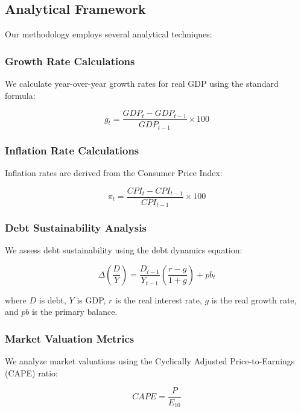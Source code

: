 \documentclass[12pt,letterpaper]{article}
\begin{document}
\subsection{Analytical Framework}

Our methodology employs several analytical techniques:

\subsubsection{Growth Rate Calculations}
We calculate year-over-year growth rates for real GDP using the standard formula:

\begin{equation}
g_t = \frac{GDP_t - GDP_{t-1}}{GDP_{t-1}} \times 100
\end{equation}

\subsubsection{Inflation Rate Calculations}
Inflation rates are derived from the Consumer Price Index:

\begin{equation}
\pi_t = \frac{CPI_t - CPI_{t-1}}{CPI_{t-1}} \times 100
\end{equation}

\subsubsection{Debt Sustainability Analysis}
We assess debt sustainability using the debt dynamics equation:

\begin{equation}
\Delta\left(\frac{D}{Y}\right) = \frac{D_{t-1}}{Y_{t-1}}\left(\frac{r-g}{1+g}\right) + pb_t
\end{equation}

where $D$ is debt, $Y$ is GDP, $r$ is the real interest rate, $g$ is the real growth rate, and $pb$ is the primary balance.

\subsubsection{Market Valuation Metrics}
We analyze market valuations using the Cyclically Adjusted Price-to-Earnings (CAPE) ratio:

\begin{equation}
CAPE = \frac{P}{E_{10}}
\end{equation}
\end{document}

